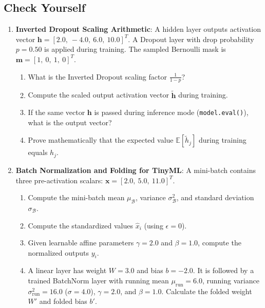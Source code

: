 \subsection{Check Yourself}\label{subsec:training_check_yourself}

\begin{checkyourself}
\begin{enumerate}
    \item \textbf{Inverted Dropout Scaling Arithmetic}:
    A hidden layer outputs activation vector $\mathbf{h} = [2.0, \ -4.0, \ 6.0, \ 10.0]^T$. A Dropout layer with drop probability $p = 0.50$ is applied during training. The sampled Bernoulli mask is $\mathbf{m} = [1, \ 0, \ 1, \ 0]^T$.
    \begin{enumerate}[label=(\alph*)]
        \item What is the Inverted Dropout scaling factor $\frac{1}{1 - p}$?
        \item Compute the scaled output activation vector $\tilde{\mathbf{h}}$ during training.
        \item If the same vector $\mathbf{h}$ is passed during inference mode (\texttt{model.eval()}), what is the output vector?
        \item Prove mathematically that the expected value $\mathbb{E}[\tilde{h}_j]$ during training equals $h_j$.
    \end{enumerate}

    \item \textbf{Batch Normalization and Folding for TinyML}:
    A mini-batch contains three pre-activation scalars: $\mathbf{x} = [2.0, \ 5.0, \ 11.0]^T$.
    \begin{enumerate}[label=(\alph*)]
        \item Compute the mini-batch mean $\mu_{\mathcal{B}}$, variance $\sigma_{\mathcal{B}}^2$, and standard deviation $\sigma_{\mathcal{B}}$.
        \item Compute the standardized values $\hat{x}_i$ (using $\epsilon = 0$).
        \item Given learnable affine parameters $\gamma = 2.0$ and $\beta = 1.0$, compute the normalized outputs $y_i$.
        \item A linear layer has weight $W = 3.0$ and bias $b = -2.0$. It is followed by a trained BatchNorm layer with running mean $\mu_{\text{run}} = 6.0$, running variance $\sigma^2_{\text{run}} = 16.0$ ($\sigma = 4.0$), $\gamma = 2.0$, and $\beta = 1.0$. Calculate the folded weight $W'$ and folded bias $b'$.
    \end{enumerate}


\end{enumerate}
\end{checkyourself}
